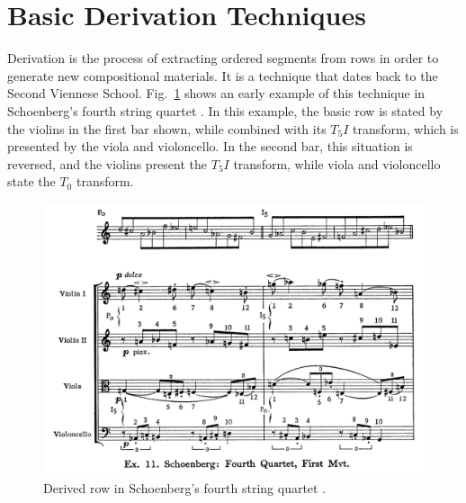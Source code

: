 \section{Basic Derivation Techniques}

Derivation is the process of extracting ordered segments from rows in order to generate new compositional materials. It is a technique that dates back to the Second Viennese School. Fig.~\ref{fig:schoenberg-quartet} shows an early example of this technique in Schoenberg's fourth string quartet \cite[100]{Westergaard1966}. In this example, the basic row is stated by the violins in the first bar shown, while combined with its $T_5I$ transform, which is presented by the viola and violoncello. In the second bar, this situation is reversed, and the violins present the $T_5I$ transform, while viola and violoncello state the $T_0$ transform.

\begin{figure}[htbp]
    \centering
	\includegraphics[width=6.5in]{figures/schoenberg4.png}
	\caption[Derived Row in Schoenberg's fourth string quartet]{Derived row in Schoenberg's fourth string quartet \cite[100]{Westergaard1966}.}
	\label{fig:schoenberg-quartet}
\end{figure}


